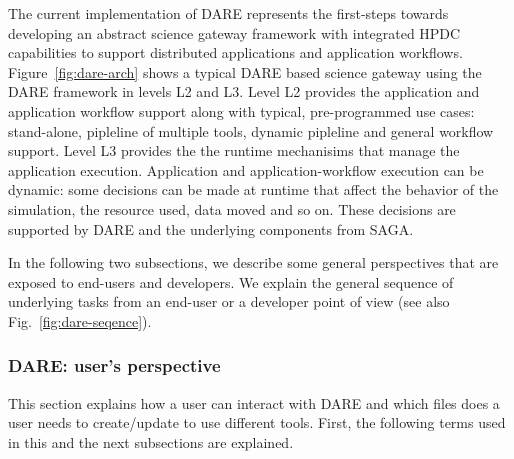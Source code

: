 \documentclass[]{svjour3}
\begin{document}
The current implementation of DARE represents the first-steps towards developing
an abstract science gateway framework with integrated HPDC capabilities to support
distributed applications and application workflows. Figure~\ref{fig:dare-arch}
shows a typical DARE based science gateway using the DARE framework in
levels L2 and L3. Level L2 provides the application and application workflow
support along with typical, pre-programmed use cases: stand-alone, pipleline of
multiple tools, dynamic pipleline and general workflow support. Level L3 provides
the the runtime mechanisims that manage the application execution. Application
and application-workflow execution can be dynamic: some decisions can be made
at runtime that affect the behavior of the simulation, the resource used,
data moved and so on. These decisions are supported by DARE and the
underlying components from SAGA.

In the following two subsections, we describe some general perspectives
that are exposed to end-users and developers. We explain the general sequence
of underlying tasks from an end-user or a developer point of view
(see also Fig.~\ref{fig:dare-seqence}). 


\subsubsection{DARE: user's perspective}

This section explains how a user can interact with DARE and which files
does a user needs to create/update to use different tools. First, the
following terms used in this and the next subsections are explained.

%
% 
% 
% 
\end{document}
